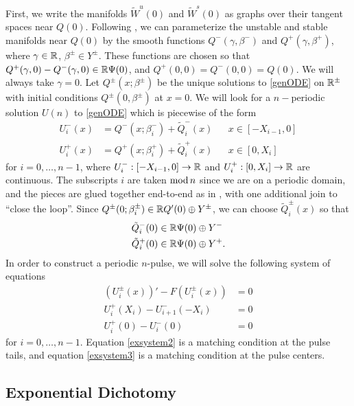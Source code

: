 \documentclass[10pt,reqno]{amsart}
\theoremstyle{plain}
\theoremstyle{definition}
\theoremstyle{remark}
\numberwithin{theorem}{section}
\numberwithin{equation}{section}
\begin{document}
First, we write the manifolds $\tilde{W}^u(0)$ and $\tilde{W}^s(0)$ as graphs over their tangent spaces near $Q(0)$. Following \cite{Sandstede1997}, we can parameterize the unstable and stable manifolds near $Q(0)$ by the smooth functions $Q^-(\gamma, \beta^-)$ and $Q^+(\gamma, \beta^+)$, where $\gamma \in \mathbb{R}$, $\beta^\pm \in Y^\pm$. These functions are chosen so that $Q^+(\gamma, 0) - Q^-(\gamma, 0) \in \mathbb{R} \Psi(0)$, and $Q^+(0, 0) = Q^-(0, 0) = Q(0)$. We will always take $\gamma = 0$. Let $Q^\pm(x; \beta^\pm)$ be the unique solutions to \eqref{genODE} on $\mathbb{R}^\pm$ with initial conditions $Q^\pm(0, \beta^\pm)$ at $x = 0$. We will look for a $n-$periodic solution $U(n)$ to \eqref{genODE} which is piecewise of the form
\begin{equation}\label{Upiecewise}
\begin{aligned}
U_i^-(x) &= Q^-(x; \beta_i^-) + \tilde{Q}_i^-(x) && x \in [-X_{i-1}, 0] \\
U_i^+(x) &= Q^+(x; \beta_i^+) + \tilde{Q}_i^+(x) && x \in [0, X_i]
\end{aligned}
\end{equation}
for $i = 0, \dots, n-1$, where $U_i^-: [-X_{i-1}, 0] \rightarrow \mathbb{R}$ and $U_i^+: [0, X_i] \rightarrow \mathbb{R}$ are continuous. The subscripts $i$ are taken $\mathop\mathrm{mod}\nolimits n$ since we are on a periodic domain, and the pieces are glued together end-to-end as in \cite{Sandstede1998}, with one additional join to ``close the loop''. Since $Q^\pm(0; \beta_i^\pm) \in \mathbb{R} Q'(0) \oplus Y^\pm$, we can choose $\tilde{Q}_i^\pm(x)$ so that
\begin{align*}
\tilde{Q}_i^-(0) &\in \mathbb{R} \Psi(0) \oplus Y^- \\
\tilde{Q}_i^+(0) &\in \mathbb{R} \Psi(0) \oplus Y^+.
\end{align*}
In order to construct a periodic $n$-pulse, we will solve the following system of equations
\begin{align}
(U_i^\pm(x))' - F(U_i^\pm(x)) &= 0 \label{exsystem1} \\
U_i^+(X_i) - U_{i+1}^-(-X_i) &= 0 \label{exsystem2} \\
U_i^+(0) - U_i^-(0) &= 0 \label{exsystem3}
\end{align}
for $i = 0, \dots, n-1$. Equation \cref{exsystem2} is a matching condition at the pulse tails, and equation \cref{exsystem3} is a matching condition at the pulse centers.

\subsection{Exponential Dichotomy}\label{sec:existdichot}
\end{document}
